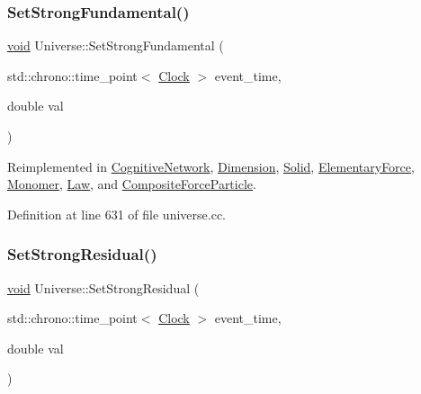 \subsubsection{\texorpdfstring{Set\+Strong\+Fundamental()}{SetStrongFundamental()}}
{\footnotesize\ttfamily \mbox{\hyperlink{glad_8h_a950fc91edb4504f62f1c577bf4727c29}{void}} Universe\+::\+Set\+Strong\+Fundamental (\begin{DoxyParamCaption}\item[{std\+::chrono\+::time\+\_\+point$<$ \mbox{\hyperlink{universe_8h_a0ef8d951d1ca5ab3cfaf7ab4c7a6fd80}{Clock}} $>$}]{event\+\_\+time,  }\item[{double}]{val }\end{DoxyParamCaption})\hspace{0.3cm}{\ttfamily [virtual]}}



Reimplemented in \mbox{\hyperlink{class_cognitive_network_ac54286eea279f5caa98b642b9084fd55}{Cognitive\+Network}}, \mbox{\hyperlink{class_dimension_a2de864aaa4b1074684395dbe928468c1}{Dimension}}, \mbox{\hyperlink{class_solid_a4342786a7785b1a3816d20de02105bcf}{Solid}}, \mbox{\hyperlink{class_elementary_force_afb00e9a10ec33eeb1daefce39b0468b7}{Elementary\+Force}}, \mbox{\hyperlink{class_monomer_ad9df06c1a8264bfdb514ef3ba04ef4c7}{Monomer}}, \mbox{\hyperlink{class_law_a4a7c8caa24acf453c1a8782a1ec4acf4}{Law}}, and \mbox{\hyperlink{class_composite_force_particle_a28d835658edcbecf60162475a8cb1ab6}{Composite\+Force\+Particle}}.



Definition at line 631 of file universe.\+cc.

\mbox{\label{class_universe_a1b2d6197ddf3d613cc30bd04d22ed8b7}} 
\subsubsection{\texorpdfstring{Set\+Strong\+Residual()}{SetStrongResidual()}}
{\footnotesize\ttfamily \mbox{\hyperlink{glad_8h_a950fc91edb4504f62f1c577bf4727c29}{void}} Universe\+::\+Set\+Strong\+Residual (\begin{DoxyParamCaption}\item[{std\+::chrono\+::time\+\_\+point$<$ \mbox{\hyperlink{universe_8h_a0ef8d951d1ca5ab3cfaf7ab4c7a6fd80}{Clock}} $>$}]{event\+\_\+time,  }\item[{double}]{val }\end{DoxyParamCaption})\hspace{0.3cm}{\ttfamily [virtual]}}



